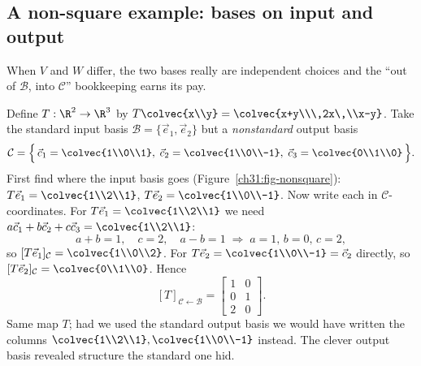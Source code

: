 \subsection{A non-square example: bases on input and output}
\label{ch31:nonsquare}

When $V$ and $W$ differ, the two bases really are independent choices and the
``out of $\mathcal{B}$, into $\mathcal{C}$'' bookkeeping earns its pay.

\begin{example}
\label{ch31:ex-nonsquare}
Define $T:\R^2\to\R^3$ by
$T\colvec{x\\y}=\colvec{x+y\\\,2x\,\\x-y}$. Take the standard input basis
$\mathcal{B}=\{\vec{e}_1,\vec{e}_2\}$ but a \emph{nonstandard} output basis
\[
  \mathcal{C}=\Big\{\,\vec{c}_1=\colvec{1\\0\\1},\;\vec{c}_2=\colvec{1\\0\\-1},\;\vec{c}_3=\colvec{0\\1\\0}\,\Big\}.
\]
First find where the input basis goes
(Figure~\ref{ch31:fig-nonsquare}):
$T\vec{e}_1=\colvec{1\\2\\1}$, $T\vec{e}_2=\colvec{1\\0\\-1}$. Now write each in
$\mathcal{C}$-coordinates. For $T\vec{e}_1=\colvec{1\\2\\1}$ we need
$a\vec{c}_1+b\vec{c}_2+c\vec{c}_3=\colvec{1\\2\\1}$:
\[
  a+b=1,\quad c=2,\quad a-b=1 \;\Rightarrow\; a=1,\,b=0,\,c=2,
\]
so $[T\vec{e}_1]_{\mathcal{C}}=\colvec{1\\0\\2}$. For
$T\vec{e}_2=\colvec{1\\0\\-1}=\vec{c}_2$ directly, so
$[T\vec{e}_2]_{\mathcal{C}}=\colvec{0\\1\\0}$. Hence
\[
  [T]_{\mathcal{C}\leftarrow\mathcal{B}}
  = \begin{bmatrix} 1 & 0\\ 0 & 1\\ 2 & 0 \end{bmatrix}.
\]
Same map $T$; had we used the standard output basis we would have written the
columns $\colvec{1\\2\\1},\colvec{1\\0\\-1}$ instead. The clever output basis
revealed structure the standard one hid.
\end{example}

